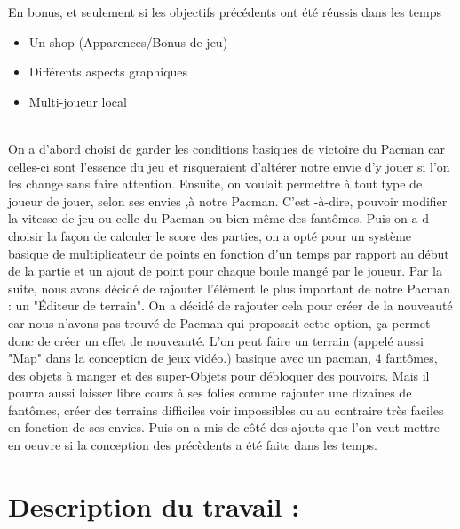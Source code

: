 \documentclass[12pt,a4paper,article]{article} %
\begin{document}
En bonus, et seulement si les objectifs précédents ont été réussis dans les temps
\begin{itemize}
  \item Un shop (Apparences/Bonus de jeu)
  \item Diff\'erents aspects graphiques
  \item Multi-joueur local
\end{itemize}
\\
On a d'abord choisi de garder les conditions basiques de victoire du Pacman car celles-ci sont l'essence du jeu et risqueraient d'altérer notre envie d'y jouer si l'on les change sans faire attention. Ensuite, on voulait permettre à tout type de joueur de jouer, selon ses envies ,à notre Pacman. C'est -à-dire, pouvoir modifier la vitesse de jeu ou celle du Pacman ou bien même des fantômes. Puis on a d\� choisir la façon de calculer le score des parties, on a opt\'e pour un système basique de multiplicateur de points en fonction d'un temps par rapport au début de la partie et un ajout de point pour chaque boule mangé par le joueur. Par la suite, nous avons décid\'e de rajouter l'élément le plus important de notre Pacman : un "Éditeur de terrain". On a décidé de rajouter cela pour créer de la nouveauté car nous n'avons pas trouvé de Pacman qui proposait cette option, ça permet donc de créer un effet de nouveauté. L'on peut faire un terrain (appelé aussi "Map" dans la conception de jeux vidéo.) basique avec un pacman, 4 fantômes, des objets à manger et des super-Objets pour débloquer des pouvoirs. Mais il pourra aussi laisser libre cours à ses folies comme rajouter une dizaines de fantômes, créer des terrains difficiles voir impossibles ou au contraire très faciles en fonction de ses envies. Puis on a mis de côté des ajouts que l'on veut mettre en oeuvre si la conception des précèdents  a \'et\'e faite dans les temps.









\section{Description du travail :}
\end{document}
